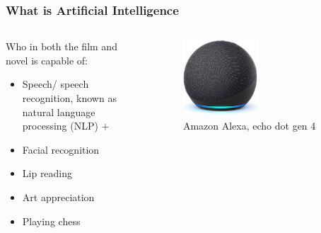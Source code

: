 \documentclass[aspectratio=169]{beamer}
\begin{document}
  \begin{frame}
    \frametitle{What is Artificial Intelligence}
    \begin{columns}
      \begin{column}{0.5\textwidth}
        Who in both the film and novel is capable of:
        \begin{itemize}
          \item Speech/ speech recognition, known as natural language processing (NLP) $+$
          \item Facial recognition
          \item Lip reading
          \item Art appreciation
          \item Playing chess
        \end{itemize}
      \end{column}
      \begin{column}{0.5\textwidth}
        \begin{figure}[th!]
          \centering
          \includegraphics[width=0.5\textwidth]{alexa.jpg}
          \caption{Amazon Alexa, echo dot gen 4}
          \label{fig:jim_carrey}
        \end{figure}
      \end{column}
    \end{columns}
  \end{frame}
\end{document}
